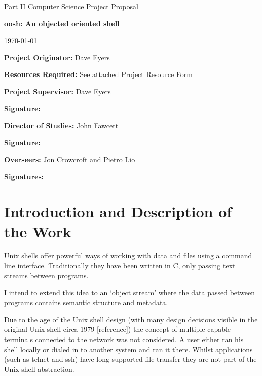 \documentclass[12pt]{article}
\begin{document}
\thispagestyle{empty}

\medskip
{}
\medskip
{}

\vfil

\centerline{\large Part II Computer Science Project Proposal}
\vspace{0.4in}
\centerline{\Large\bf oosh: An objected oriented shell}
\vspace{0.3in}
\centerline{\large \today}

\vfil

{\bf Project Originator:} Dave Eyers

\vspace{0.1in}

{\bf Resources Required:} See attached Project Resource Form

\vspace{0.5in}

{\bf Project Supervisor:} Dave Eyers

\vspace{0.2in}

{\bf Signature:}

\vspace{0.5in}

{\bf Director of Studies:}  John Fawcett

\vspace{0.2in}

{\bf Signature:}

\vspace{0.5in}

{\bf Overseers:} Jon Crowcroft and Pietro Lio

\vspace{0.2in}

{\bf Signatures:}

\vfil
\eject

\section*{Introduction and Description of the Work}
Unix shells offer powerful ways of working with data and files using a
command line interface. Traditionally they have been written in C,
only passing text streams between programs.

I intend to extend this idea to an `object stream' where the data
passed between programs contains semantic structure and metadata. 

Due to the age of the Unix shell design (with many design decisions
visible in the original Unix shell circa 1979 [reference]) the concept
of multiple capable terminals connected to the network was not
considered. A user either ran his shell locally or dialed in to
another system and ran it there. Whilst applications (such as telnet
and ssh) have long supported file transfer they are not part of the
Unix shell abstraction.
\end{document}
